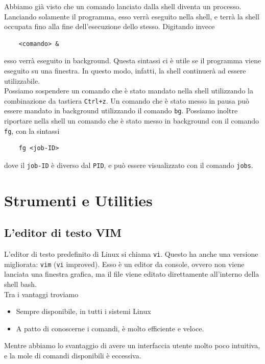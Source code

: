 Abbiamo già visto che un comando lanciato dalla shell diventa un processo. Lanciando solamente il programma, esso verrà eseguito nella shell, e terrà la shell occupata fino alla fine dell'esecuzione dello stesso. Digitando invece
\begin{verbatim}
	<comando> &
\end{verbatim}
esso verrà eseguito in background. Questa sintassi ci è utile se il programma viene eseguito su una finestra. In questo modo, infatti, la shell continuerà ad essere utilizzabile. \\
Possiamo sospendere un comando che è stato mandato nella shell utilizzando la combinazione da tastiera \verb*|Ctrl+z|. Un comando che è stato messo in pausa può essere mandato in background utilizzando il comando \verb*|bg|. Possiamo inoltre riportare nella shell un comando che è stato messo in background con il comando \verb*|fg|, con la sintassi
\begin{verbatim}
	fg <job-ID>
\end{verbatim}
dove il \verb*|job-ID| è diverso dal \verb*|PID|, e può essere visualizzato con il comando \verb*|jobs|.

\chapter{Strumenti e Utilities}

\section{L'editor di testo VIM}
L'editor di testo predefinito di Linux si chiama \verb*|vi|. Questo ha anche una versione migliorata: \verb*|vim| (\verb*|vi| improved). Esso è un editor da console, ovvero non viene lanciata una finestra grafica, ma il file viene editato direttamente all'interno della shell bash.\\
Tra i vantaggi troviamo
\begin{itemize}
	\item Sempre disponibile, in tutti i sistemi Linux 
	\item A patto di conoscerne i comandi, è molto efficiente e veloce.
\end{itemize}
Mentre abbiamo lo svantaggio di avere un interfaccia utente molto poco intuitiva, e la mole di comandi disponibili è eccessiva. 


